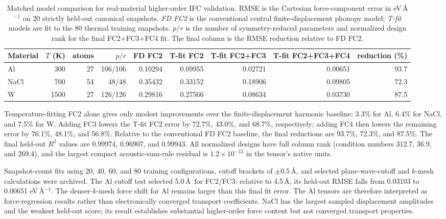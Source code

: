 \documentclass[aps,prb,reprint,amsmath,amssymb,floatfix]{revtex4-2}
\begin{document}
\begin{table}[htbp]

\caption{Matched model comparison for real-material higher-order IFC
validation. RMSE is the Cartesian force-component error in
eV\,\AA\(^{-1}\) on 20 strictly held-out canonical snapshots.
\emph{FD FC2} is the conventional central finite-displacement phonopy model;
\emph{T-fit} models are fit to the 80 thermal training snapshots. \(p/r\) is
the number of symmetry-reduced parameters and normalized design rank for the
final FC2+FC3+FC4 fit. The final column is the RMSE reduction relative to
FD FC2.}
\begin{ruledtabular}
\begin{tabular}{lrrrrrrrr}
Material & \(T\) (K) & atoms & \(p/r\) & FD FC2 &
T-fit FC2 & T-fit FC2+FC3 & T-fit FC2+FC3+FC4 & reduction (\%) \\
\hline
Al   & 300  & 27 & 106/106 & 0.10294 & 0.09955 & 0.02721 & 0.00651 & 93.7 \\
NaCl & 700  & 54 &  48/48  & 0.35432 & 0.33152 & 0.18906 & 0.09805 & 72.3 \\
W    & 1500 & 27 & 126/126 & 0.29816 & 0.27566 & 0.08634 & 0.03730 & 87.5 \\
\end{tabular}
\end{ruledtabular}
\label{tab:ifc34}

\end{table}

Temperature-fitting FC2 alone gives only modest improvements over the
finite-displacement harmonic baseline: 3.3\% for Al, 6.4\% for NaCl, and
7.5\% for W.  Adding FC3 lowers the T-fit FC2 error by 72.7\%, 43.0\%, and
68.7\%, respectively; adding FC4 then lowers the remaining error by 76.1\%,
48.1\%, and 56.8\%.  Relative to the conventional FD FC2 baseline, the final
reductions are 93.7\%, 72.3\%, and 87.5\%.  The final held-out \(R^2\) values
are 0.99974, 0.96907, and 0.99943.  All normalized designs have full column
rank (condition numbers 312.7, 36.9, and 269.4), and the largest compact
acoustic-sum-rule residual is \(1.2\times10^{-12}\) in the tensor's native
units.

Snapshot-count fits using 20, 40, 60, and 80 training configurations, cutoff
brackets of \(\pm0.5\)\,\AA, and selected plane-wave-cutoff and
\(k\)-mesh calculations were archived.  The Al cutoff test selected
5.0\,\AA\ for FC2/FC3: relative to 4.5\,\AA, its held-out RMSE falls
from 0.03103 to 0.00651 eV\,\AA\(^{-1}\).  The denser-\(k\)-mesh force
shift for Al remains larger than this final fit error. The Al tensors are
therefore interpreted as force-regression results rather than electronically
converged transport coefficients.  NaCl has
the largest sampled displacement amplitudes and the weakest held-out score;
its result establishes substantial higher-order force content but not
converged transport properties.
\end{document}
